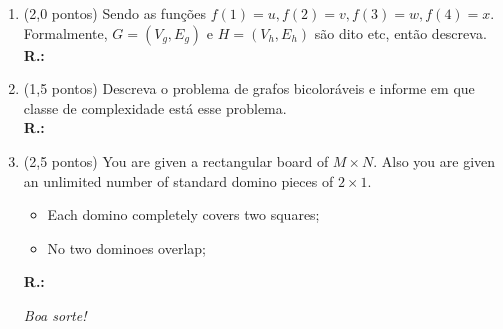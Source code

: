 \documentclass[12pt]{article}
\begin{document}
	\begin{enumerate}
		\item \textsf{(2,0 pontos)} Sendo as funções $f(1) = u, f(2) = v, f(3) = w, f(4) = x$. Formalmente, $G = (V_g,E_g)$ e $H = (V_h,E_h)$ são dito etc, então descreva.\\[0.3cm]
		\textbf{R.:}\\[0.6cm]

		\item \textsf{(1,5 pontos)} Descreva o problema de grafos bicoloráveis e informe em que classe de complexidade está esse problema.\\[0.3cm]
		\textbf{R.:}\\[0.6cm]

		\item \textsf{(2,5 pontos)} You are given a rectangular board of $M \times N$. Also you are given an unlimited number of standard domino pieces of $2 \times 1$. 

		\begin{itemize}
			\item Each domino completely covers two squares;
			\item No two dominoes overlap;
		\end{itemize}

		\textbf{R.:}\\[1cm]		
		\begin{flushright}
			\textit{Boa sorte!}
		\end{flushright}
	\end{enumerate}
\end{document}
